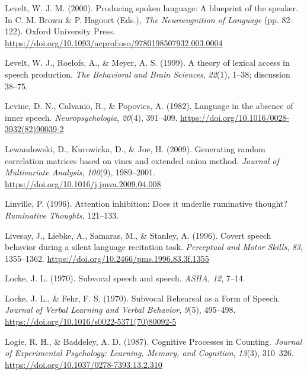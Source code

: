 \documentclass[a4paper,12pt,twoside,onecolumn,openright,final,oldfontcommands]{memoir}
\begin{document}
\leavevmode\hypertarget{ref-brown_producing_2000}{}%
Levelt, W. J. M. (2000). Producing spoken language: A blueprint of the speaker. In C. M. Brown \& P. Hagoort (Eds.), \emph{The Neurocognition of Language} (pp. 82--122). Oxford University Press. \url{https://doi.org/10.1093/acprof:oso/9780198507932.003.0004}

\leavevmode\hypertarget{ref-levelt_theory_1999}{}%
Levelt, W. J., Roelofs, A., \& Meyer, A. S. (1999). A theory of lexical access in speech production. \emph{The Behavioral and Brain Sciences}, \emph{22}(1), 1--38; discussion 38--75.

\leavevmode\hypertarget{ref-levine_language_1982}{}%
Levine, D. N., Calvanio, R., \& Popovics, A. (1982). Language in the absence of inner speech. \emph{Neuropsychologia}, \emph{20}(4), 391--409. \url{https://doi.org/10.1016/0028-3932(82)90039-2}

\leavevmode\hypertarget{ref-lewandowski_generating_2009}{}%
Lewandowski, D., Kurowicka, D., \& Joe, H. (2009). Generating random correlation matrices based on vines and extended onion method. \emph{Journal of Multivariate Analysis}, \emph{100}(9), 1989--2001. \url{https://doi.org/10.1016/j.jmva.2009.04.008}

\leavevmode\hypertarget{ref-linville_attention_1996}{}%
Linville, P. (1996). Attention inhibition: Does it underlie ruminative thought? \emph{Ruminative Thoughts}, 121--133.

\leavevmode\hypertarget{ref-livesay_covert_1996}{}%
Livesay, J., Liebke, A., Samaras, M., \& Stanley, A. (1996). Covert speech behavior during a silent language recitation task. \emph{Perceptual and Motor Skills}, \emph{83}, 1355--1362. \url{https://doi.org/10.2466/pms.1996.83.3f.1355}

\leavevmode\hypertarget{ref-locke_subvocal_1970-1}{}%
Locke, J. L. (1970). Subvocal speech and speech. \emph{ASHA}, \emph{12}, 7--14.

\leavevmode\hypertarget{ref-locke_subvocal_1970}{}%
Locke, J. L., \& Fehr, F. S. (1970). Subvocal Rehearsal as a Form of Speech. \emph{Journal of Verbal Learning and Verbal Behavior}, \emph{9}(5), 495--498. \url{https://doi.org/10.1016/s0022-5371(70)80092-5}

\leavevmode\hypertarget{ref-logie_cognitive_1987}{}%
Logie, R. H., \& Baddeley, A. D. (1987). Cognitive Processes in Counting. \emph{Journal of Experimental Psychology: Learning, Memory, and Cognition}, \emph{13}(3), 310--326. \url{https://doi.org/10.1037/0278-7393.13.2.310}
\end{document}
